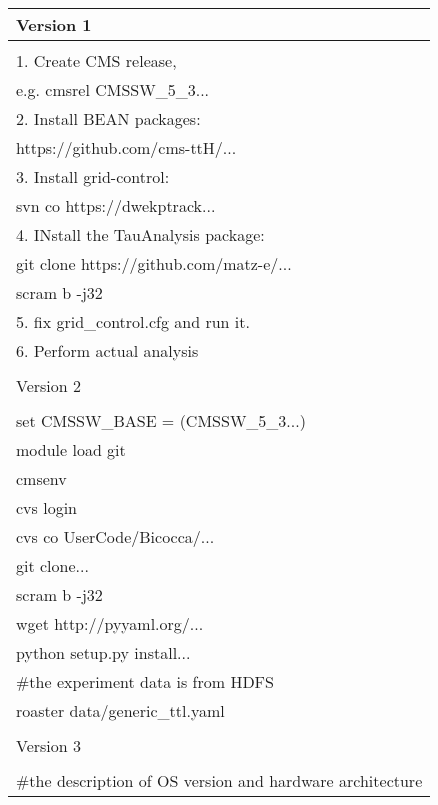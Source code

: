 \documentclass{acm_proc_article-sp}
\begin{document}
\begin{table}
    \centering
    \begin{tabular}{|l|}
        \hline
        Version 1\\ \hline
        \\
        1. Create CMS release,\\
            \hspace{9pt} e.g. cmsrel CMSSW\_5\_3... \\
        2. Install BEAN packages: \\
            \hspace{9pt} https://github.com/cms-ttH/...\\
        3. Install grid-control: \\ 
            \hspace{9pt} svn co https://dwekptrack... \\
        4. INstall the TauAnalysis package: \\
           \hspace{9pt} git clone https://github.com/matz-e/... \\
           \hspace{9pt} scram b -j32 \\
        5. fix grid\_control.cfg and run it. \\
        6. Perform actual analysis \\ 
        \\ \hline
        Version 2\\ \hline
        \\
        set CMSSW\_BASE = (CMSSW\_5\_3...) \\
        module load git \\        
        cmsenv \\ 
        cvs login \\
        cvs co UserCode/Bicocca/... \\
        git clone... \\
        scram b -j32 \\
        wget http://pyyaml.org/... \\
        python setup.py install... \\
        \#the experiment data is from HDFS \\
        roaster data/generic\_ttl.yaml \\ 
        \\ \hline
        Version 3\\ \hline
        \\
        \#the description of OS version and hardware architecture \\

\end{tabular}
\end{table}
\end{document}
